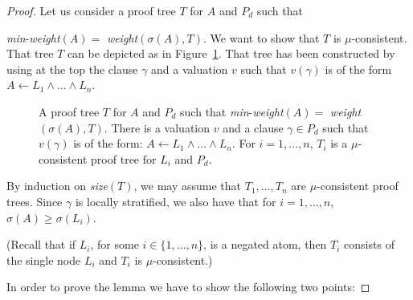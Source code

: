 \documentclass[english]{tlp}
\begin{document}
\begin{proof}
Let us consider a proof tree $T$ for $A$ and $P_d$ such that 

\noindent
{\it{min}}-{\it{weight}}$(A)=$ {\it{weight}}$(\sigma(A),T)$.
We want to show that $T$ is $\mu$-consistent. That tree $T$ can be 
depicted as in Figure~\ref{fig:lemma-mu-consistency-in-Pd}. That
tree has been constructed by using at the top the clause $\gamma$ and a 
valuation $v$ such that $v(\gamma)$ is of the form
$A\leftarrow L_1\wedge\ldots\wedge L_n$.


\begin{figure}[ht]
\begin{center}
\end{center}
\vspace{-3mm}
\caption{A proof tree $T$ for $A$ and $P_d$ such that 
{\it{min}}-{\it{weight}}$(A)=$ {\it{weight}}$(\sigma(A),T)$. There is a valuation $v$ and  a clause $\gamma\in P_d$ such that $v(\gamma)$ is of the form:
$A\leftarrow L_1\wedge \ldots \wedge L_n$.
For $i=1,\ldots,n$, $T_i$ is a $\mu$-consistent proof tree for $L_i$ and $P_d$.
\label{fig:lemma-mu-consistency-in-Pd}}
\end{figure}

By induction on {\it{size}}$(T)$, we may assume that $T_1,\ldots,T_n$ are
$\mu$-consistent proof trees. Since $\gamma$ is locally stratified, we also 
have that
for $i\!=\!1,\ldots,n$, $\sigma(A)\geq\sigma(L_i)$.

\noindent
(Recall that if $L_i$, for some $i\in \{1,\ldots,
n\}$, is a negated atom, then $T_i$ consists of the single node $L_i$ and
$T_i$ is $\mu$-consistent.)

In order to prove the lemma we have to show the following two points:


\end{proof}
\end{document}
